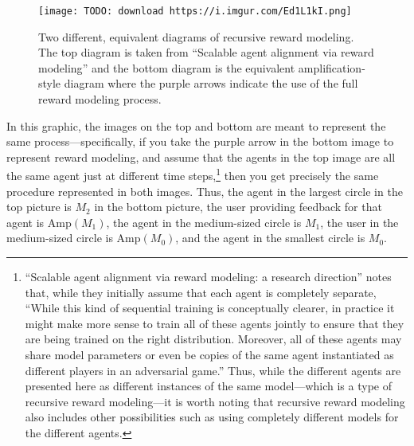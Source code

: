 \begin{figure}[h!]
  \centering
  \texttt{[image: TODO: download https://i.imgur.com/Ed1L1kI.png]}
  \caption{Two different, equivalent diagrams of recursive reward modeling. The top diagram is taken from ``Scalable agent alignment via reward modeling\cite{TODO: cite https://medium.com/@deepmindsafetyresearch/scalable-agent-alignment-via-reward-modeling-bf4ab06dfd84}'' and the bottom diagram is the equivalent amplification-style diagram where the purple arrows indicate the use of the full reward modeling process.}
\end{figure}

In this graphic, the images on the top and bottom are meant to represent the same process---specifically, if you take the purple arrow in the bottom image to represent reward modeling, and assume that the agents in the top image are all the same agent just at different time steps,\footnote{``Scalable agent alignment via reward modeling: a research direction\cite{TODO: cite https://arxiv.org/abs/1811.07871}'' notes that, while they initially assume that each agent is completely separate, ``While this kind of sequential training is conceptually clearer, in practice it might make more sense to train all of these agents jointly to ensure that they are being trained on the right distribution. Moreover, all of these agents may share model parameters or even be copies of the same agent instantiated as different players in an adversarial game.'' Thus, while the different agents are presented here as different instances of the same model---which is a type of recursive reward modeling---it is worth noting that recursive reward modeling also includes other possibilities such as using completely different models for the different agents.} then you get precisely the same procedure represented in both images. Thus, the agent in the largest circle in the top picture is $M_2$ in the bottom picture, the user providing feedback for that agent is $\text{Amp}(M_1)$, the agent in the medium-sized circle is $M_1$, the user in the medium-sized circle is $\text{Amp}(M_0)$, and the agent in the smallest circle is $M_0$.

